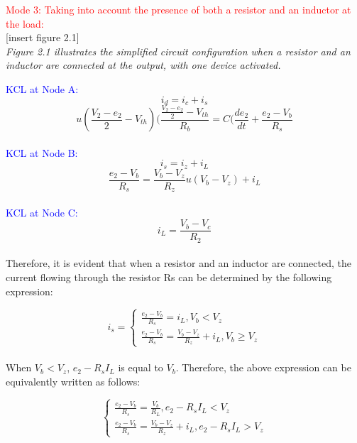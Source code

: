\large\textcolor{red}{Mode 3: Taking into account the presence of both a resistor and an inductor at the load:}\\

[insert figure 2.1]\\

\emph{Figure 2.1 illustrates the simplified circuit configuration when a resistor and an inductor are connected at the output, with one device activated.}

\textcolor{blue}{KCL at Node A:}\\
\begin{equation}
    i_d=i_c+i_s
\end{equation}
\begin{equation}
    u(\frac{V_2-e_2}{2}-V_{th})(\frac{\frac{V_2-e_2}{2}-V_{th}}{R_b}=C(\frac{de_2}{dt}+\frac{e_2-V_b}{R_s}
\end{equation}\\

\textcolor{blue}{KCL at Node B:}\\
\begin{equation}
    i_s=i_z+i_L
\end{equation}
\begin{equation}
    \frac{e_2-V_b}{R_s}=\frac{V_b-V_z}{R_z}u(V_b-V_z)+i_L
\end{equation}\\

\textcolor{blue}{KCL at Node C:}\\
\begin{equation}
    i_L=\frac{V_b-V_c}{R_2}
\end{equation}\\

Therefore, it is evident that when a resistor and an inductor are connected, the current flowing through the resistor Rs can be determined by the following expression:

\begin{equation}
     i_s=\begin{cases}
        \frac{e_2-V_b}{R_s}=i_L,  V_b<V_z\\
        \frac{e_2-V_b}{R_s}=\frac{V_b-V_z}{R_z}+i_L,  V_b \geq V_z
        \end{cases}
\end{equation}\\

When $V_b < V_z$, $e_2 - R_sI_L$ is equal to $V_b$. Therefore, the above expression can be equivalently written as follows:

\begin{equation}
    \begin{cases}
        \frac{e_2-V_b}{R_s}=\frac{V_b}{R_L}, e_2-R_sI_L<V_z\\
        \frac{e_2-V_b}{R_s}=\frac{V_b-V_z}{R_z}+i_L, e_2-R_sI_L>V_z
    \end{cases}
\end{equation}\\

